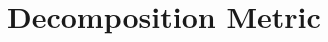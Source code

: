 \documentclass[../main.tex]{subfiles}
\begin{document}



\section{Decomposition Metric}
\label{section:multi_decomposition_metric}
\end{document}
